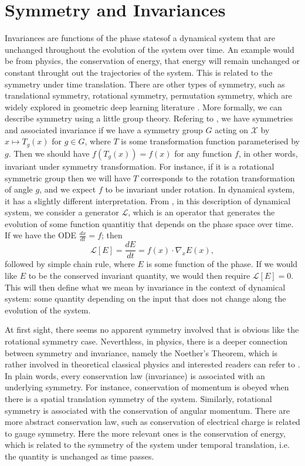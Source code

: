 \documentclass{statsmsc}
\begin{document}
\section{Symmetry and Invariances}
Invariances are functions of the phase statesof a dynamical system that are unchanged throughout the evolution of the system over time. 
An example would be from physics, the conservation of energy, that energy will remain unchanged or constant throught out the trajectories of the system.
This is related to the symmetry under time translation.
There are other types of symmetry, such as translational symmetry, rotational symmetry, permutation symmetry, which are widely explored in geometric deep learning literature \cite{Bronstein2017}. 
More formally, we can describe symmetry using a little group theory.
Refering to \cite{Kondor2008}, we have symmetries and associated invariance if we have a symmetry group $G$ acting on $\mathcal{X}$ by $x\mapsto T_g(x)$ for $g\in G$, where $T$ is some transformation function parameterised by $g$. 
Then we should have $f(T_g(x))=f(x)$ for any function $f$, in other words, invariant under symmetry transformation.
For instance, if it is a rotational symmetric group then we will have $T$ corresponds to the rotation transformation of angle $g$, and we expect $f$ to be invariant under rotation.
In dynamical system, it has a slightly different interpretation.
From \cite{marsden_sirovich_antman_2008}, in this description of dynamical system, we consider a generator $\mathcal{L}$, which is an operator that generates the evolution of some function quantitiy that depends on the phase space over time.
If we have the ODE $\frac{dx}{dt}=f$; then $$\mathcal{L}[E]=\frac{dE}{dt}=f(x)\cdot \nabla_x E(x),$$ followed by simple chain rule, where $E$ is some function of the phase.
If we would like $E$ to be the conserved invariant quantity, we would then require $\mathcal{L}[E]=0$. 
This will then define what we mean by invariance in the context of dynamical system: some quantity depending on the input that does not change along the evolution of the system.

At first sight, there seems no apparent symmetry involved that is obvious like the rotational symmetry case. 
Neverthless, in physics, there is a deeper connection between symmetry and invariance, namely the Noether's Theorem, which is rather involved in theoretical classical physics and interested readers can refer to \cite{lemos_2018}.
In plain words, every conservation law (invariance) is associated with an underlying symmetry.
For instance, conservation of momentum is obeyed when there is a spatial translation symmetry of the system. 
Similarly, rotational symmetry is associated with the conservation of angular momentum.
There are more abstract conservation law, such as conservation of electrical charge is related to gauge symmetry.
Here the more relevant ones is the conservation of energy, which is related to the symmetry of the system under temporal translation, i.e. the quantity is unchanged as time passes.
\end{document}
